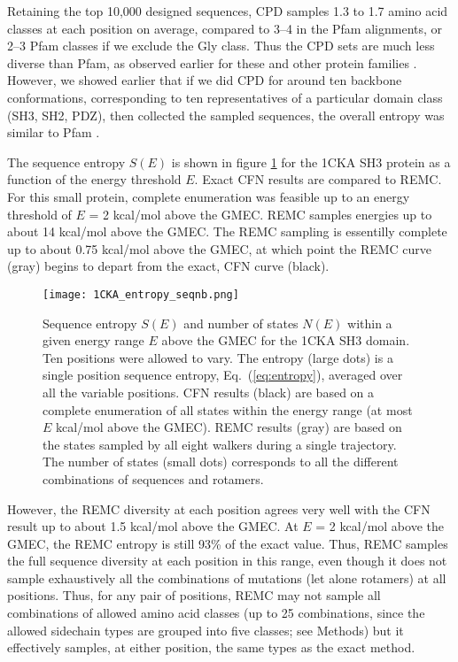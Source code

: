 Retaining the top 10,000 designed sequences, CPD samples 1.3 to 1.7 amino acid classes at each position on average, compared to 3--4 in the Pfam alignments, or 2--3 Pfam classes if we exclude the Gly class. Thus the CPD sets are much less diverse than Pfam, as observed earlier for these and other protein families \cite{Schmidt09,Schmidt10}. However, we showed earlier that if we did CPD for around ten backbone conformations, corresponding to ten representatives of a particular domain class (SH3, SH2, PDZ), then collected the sampled sequences, the overall entropy was similar to Pfam \cite{Schmidt09,Schmidt10}. 

The sequence entropy $S(E)$ is shown in figure \ref{fig:entropy} for the 1CKA SH3 protein as a function of the energy threshold $E$. Exact CFN results are compared to REMC. For this small protein, complete enumeration was feasible up to an energy threshold of $E$ = 2 kcal/mol above the GMEC. REMC samples energies up to about 14 kcal/mol above the GMEC. The REMC sampling is essentilly complete up to about 0.75 kcal/mol above the GMEC, at which point the REMC curve (gray) begins to depart from the exact, CFN curve (black).


    \begin{figure}[!htbp]
      \centering
        \texttt{[image: 1CKA\_entropy\_seqnb.png]} 
\caption{ 
Sequence entropy $S(E)$ and number of states $N(E)$ within a given energy range $E$ above the GMEC for the 1CKA SH3 domain. Ten positions were allowed to vary. The entropy (large dots) is a single position sequence entropy, Eq.\ (\ref{eq:entropy}), averaged over all the variable positions. CFN results (black) are based on a complete enumeration of all states within the energy range (at most $E$ kcal/mol above the GMEC). REMC results (gray) are based on the states sampled by all eight walkers during a single trajectory. The number of states (small dots) corresponds to all the different combinations of sequences and rotamers.
}
       \label{fig:entropy}
    \end{figure}

However, the REMC diversity at each position agrees very well with the CFN result up to about 1.5 kcal/mol above the GMEC. At $E$ = 2 kcal/mol above the GMEC, the REMC entropy is still 93\% of the exact value.
Thus, REMC samples the full sequence diversity at each position in this range, even though it does not sample exhaustively all the combinations of mutations (let alone rotamers) at all positions. Thus, for any pair of positions, REMC may not sample all combinations of allowed amino acid classes (up to 25 combinations, since the allowed sidechain types are grouped into five classes; see Methods) but it effectively samples, at either position, the same types as the exact method.

